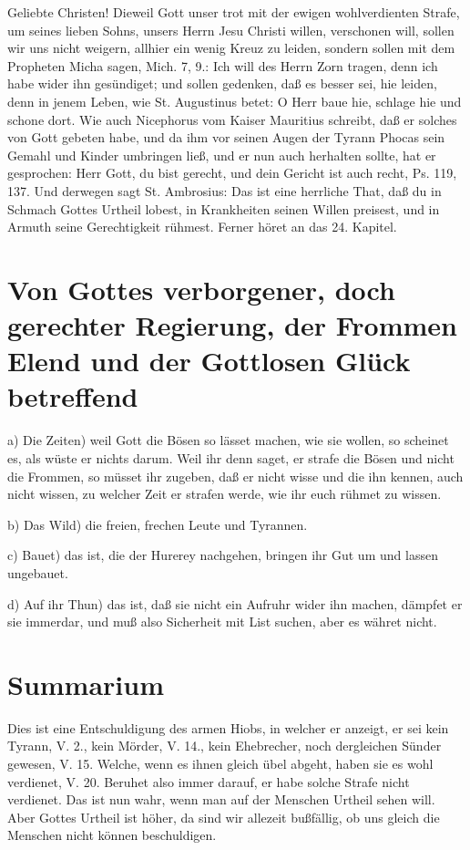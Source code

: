 Geliebte Christen! Dieweil Gott unser trot mit der ewigen wohlverdienten Strafe, um seines lieben Sohns, unsers Herrn Jesu Christi willen, verschonen will, sollen wir uns nicht weigern, allhier ein wenig Kreuz zu leiden, sondern sollen mit dem Propheten Micha sagen, Mich. 7, 9.: Ich will des Herrn Zorn tragen, denn ich habe wider ihn gesündiget; und sollen gedenken, daß es besser sei, hie leiden, denn in jenem Leben, wie St. Augustinus betet: O Herr baue hie, schlage hie und schone dort. Wie auch Nicephorus vom Kaiser Mauritius schreibt, daß
er solches von Gott gebeten habe, und da ihm vor seinen Augen der Tyrann Phocas sein Gemahl und Kinder umbringen ließ, und er nun auch herhalten sollte, hat er gesprochen: Herr Gott, du bist gerecht, und dein Gericht ist auch recht, Ps. 119, 137. Und derwegen sagt St. Ambrosius: Das ist eine herrliche That, daß du in Schmach Gottes Urtheil lobest, in Krankheiten seinen Willen preisest, und in Armuth seine Gerechtigkeit rühmest. Ferner höret an das 24. Kapitel.

\section[Von Gottes verborgener, doch gerechter Regierung, der Frommen]{Von Gottes verborgener, doch gerechter Regierung, der Frommen Elend und der Gottlosen Glück betreffend}

a) Die Zeiten) weil Gott die Bösen so lässet machen, wie sie wollen, so scheinet es, als wüste er nichts darum. Weil ihr denn saget, er strafe die Bösen und nicht die Frommen, so müsset ihr zugeben, daß er nicht wisse und die ihn kennen, auch nicht wissen, zu welcher Zeit er strafen werde, wie ihr euch rühmet zu wissen.

b) Das Wild) die freien, frechen Leute und Tyrannen.

c) Bauet) das ist, die der Hurerey nachgehen, bringen ihr Gut um und lassen ungebauet.

d) Auf ihr Thun) das ist, daß sie nicht ein Aufruhr wider ihn machen, dämpfet er sie immerdar, und muß also Sicherheit mit List suchen, aber es währet nicht.

\section{Summarium}

Dies ist eine Entschuldigung des armen Hiobs, in welcher er anzeigt, er sei kein Tyrann, V. 2., kein Mörder, V. 14., kein Ehebrecher, noch dergleichen Sünder gewesen, V. 15. Welche, wenn es ihnen gleich übel abgeht, haben sie es wohl verdienet, V. 20. Beruhet also immer darauf, er habe solche Strafe nicht verdienet. Das ist nun wahr, wenn man auf der Menschen Urtheil sehen will. Aber Gottes Urtheil ist höher, da sind wir allezeit bußfällig, ob uns gleich die Menschen nicht können beschuldigen.

